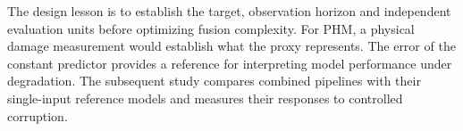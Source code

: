 The design lesson is to establish the target, observation horizon and independent
evaluation units before optimizing fusion complexity. For PHM, a physical damage
measurement would establish what the proxy represents. The error of the constant
predictor provides a reference for interpreting model performance under degradation. The
subsequent study compares combined pipelines with their single-input reference models
and measures their responses to controlled corruption.
